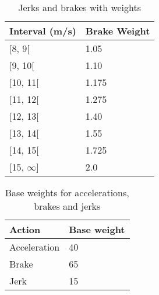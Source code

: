 \begin{table}
    \centering
    \begin{tabular}{|ll|}
    \hline
    \rowcolor{tablegreen}
    \textbf{Interval (m/s)} & \textbf{Brake Weight} \\ \hline
    {[}8, 9{[}              & 1.05 			             \\
    {[}9, 10{[}             & 1.10			              \\
    {[}10, 11{[}            & 1.175   		           \\
    {[}11, 12{[}            & 1.275  		            \\
    {[}12, 13{[}            & 1.40   		          \\
    {[}13, 14{[}            & 1.55    		          \\
    {[}14, 15{[}            & 1.725  		            \\
    {[}15, $\infty${]}      & 2.0    	   	       \\ \hline
    \end{tabular}
    \caption{Jerks and brakes with weights}
    \label{tab:jerkbrakenvalues}
\end{table}

\begin{table}
    \centering
    \begin{tabular}{|ll|}
    \hline
    \rowcolor{tablegreen}
    \textbf{Action} & \textbf{Base weight} \\ \hline
    Acceleration    & 40                   \\
    Brake           & 65                   \\
    Jerk            & 15                 \\ \hline
    \end{tabular}
    \caption{Base weights for accelerations, brakes and jerks}
    \label{tab:basevalues}
\end{table}

%
